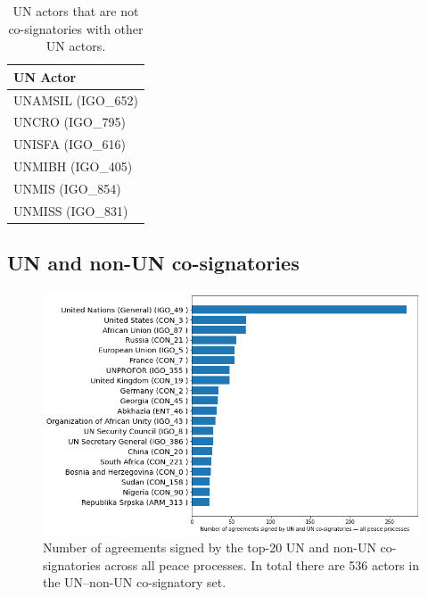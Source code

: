 \documentclass{article}
\begin{document}
\begin{table}[H]
\begin{center}
\small
\begin{tabularx}{\textwidth}{|X|}
    \hline
    \textbf{UN Actor} \\
    \hline
UNAMSIL (IGO\_652) \\
\hline
UNCRO (IGO\_795) \\
\hline
UNISFA (IGO\_616) \\
\hline
UNMIBH (IGO\_405) \\
\hline
UNMIS (IGO\_854) \\
\hline
UNMISS (IGO\_831) \\
\hline
\end{tabularx}
\end{center}
\normalsize
\caption{UN actors that are not co-signatories with other UN actors.}
\end{table}


\subsection{UN and non-UN co-signatories}

\begin{figure}[H]
\begin{center}
\includegraphics[scale=0.38]{./assets/figure_4.png}
\caption{Number of agreements signed by the top-20 UN and non-UN co-signatories across all peace processes. In total there are 536 actors in the UN--non-UN co-signatory set.}
\end{center}
\end{figure}
\end{document}
